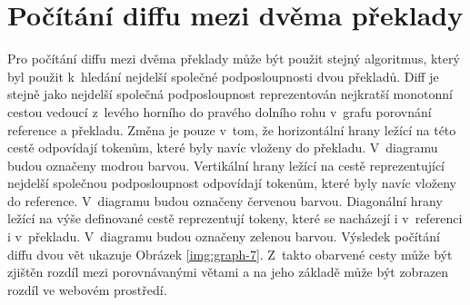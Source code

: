 \section{Počítání diffu mezi dvěma překlady}
Pro počítání diffu mezi dvěma překlady může být použit stejný algoritmus,
  který byl použit k~hledání nejdelší společné podposloupnosti dvou překladů.
Diff je stejně jako nejdelší společná podposloupnost reprezentován nejkratší monotonní cestou vedoucí z~levého horního do pravého dolního rohu v~grafu porovnání reference a překladu.
Změna je pouze v~tom, že horizontální hrany ležící na této cestě odpovídají tokenům,
  které byly navíc vloženy do překladu.
V~diagramu budou označeny modrou barvou.
Vertikální hrany ležící na cestě reprezentující nejdelší společnou podposloupnost odpovídají tokenům,
  které byly navíc vloženy do reference.
V~diagramu budou označeny červenou barvou.
Diagonální hrany ležící na výše definované cestě reprezentují tokeny,
  které se nacházejí i v~referenci i v~překladu.
V~diagramu budou označeny zelenou barvou.
Výsledek počítání diffu dvou vět ukazuje Obrázek \ref{img:graph-7}.
Z~takto obarvené cesty může být zjištěn rozdíl mezi porovnávanými větami
  a na jeho základě může být zobrazen rozdíl ve webovém prostředí.

